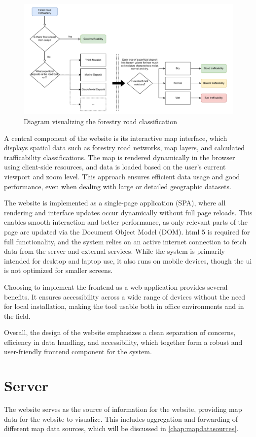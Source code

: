\begin{figure}[h]
    \centering
    \centerline{\includegraphics[width=1.2\linewidth]{figures/roadclassification.pdf}}
    \caption{Diagram visualizing the forestry road classification}
    \label{fig:forestryroadclassification}
\end{figure}

A central component of the website is its interactive map interface, which displays spatial data such as forestry road networks, map layers, and calculated trafficability classifications. The map is rendered dynamically in the browser using client-side resources, and data is loaded based on the user's current viewport and zoom level. This approach ensures efficient data usage and good performance, even when dealing with large or detailed geographic datasets.

The website is implemented as a single-page application (SPA), where all rendering and interface updates occur dynamically without full page reloads. This enables smooth interaction and better performance, as only relevant parts of the page are updated via the Document Object Model (DOM). \acrshort{html} 5 is required for full functionality, and the system relies on an active internet connection to fetch data from the server and external services. While the system is primarily intended for desktop and laptop use, it also runs on mobile devices, though the \acrshort{ui} is not optimized for smaller screens.

Choosing to implement the frontend as a web application provides several benefits. It ensures accessibility across a wide range of devices without the need for local installation, making the tool usable both in office environments and in the field.

Overall, the design of the website emphasizes a clean separation of concerns, efficiency in data handling, and accessibility, which together form a robust and user-friendly frontend component for the system.

\section{Server}

The website serves as the source of information for the website, providing map data for the website to visualize. This includes aggregation and forwarding of different map data sources, which will be discussed in \autoref{chap:mapdatasources}.


